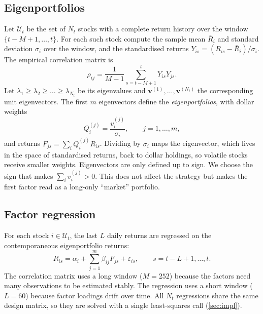 \subsection{Eigenportfolios}
\label{sec:method:pca}

Let $\mathcal U_t$ be the set of $N_t$ stocks with a complete return history over the window
$\{t-M+1,\dots,t\}$. For each such stock compute the sample mean $\bar R_i$ and standard
deviation $\sigma_i$ over the window, and the standardised returns
$Y_{is} = (R_{is} - \bar R_i)/\sigma_i$. The empirical correlation matrix is
\begin{equation}
  \rho_{ij} = \frac{1}{M-1} \sum_{s=t-M+1}^{t} Y_{is} Y_{js} .
\end{equation}
Let $\lambda_1 \ge \lambda_2 \ge \dots \ge \lambda_{N_t}$ be its eigenvalues and
$\bm v^{(1)},\dots,\bm v^{(N_t)}$ the corresponding unit eigenvectors. The first $m$
eigenvectors define the \emph{eigenportfolios}, with dollar weights
\begin{equation}
  Q_i^{(j)} = \frac{v_i^{(j)}}{\sigma_i}, \qquad j = 1,\dots,m,
  \label{eq:eigenportfolio}
\end{equation}
and returns $F_{js} = \sum_i Q_i^{(j)} R_{is}$. Dividing by $\sigma_i$ maps the eigenvector,
which lives in the space of standardised returns, back to dollar holdings, so volatile stocks
receive smaller weights. Eigenvectors are only defined up to sign. We choose the sign that
makes $\sum_i v_i^{(j)} > 0$. This does not affect the strategy but makes the first factor read
as a long-only ``market'' portfolio.

\subsection{Factor regression}
\label{sec:method:regression}

For each stock $i \in \mathcal U_t$, the last $L$ daily returns are regressed on the
contemporaneous eigenportfolio returns:
\begin{equation}
  R_{is} = \alpha_i + \sum_{j=1}^{m} \beta_{ij} F_{js} + \varepsilon_{is},
  \qquad s = t-L+1,\dots,t .
  \label{eq:regression}
\end{equation}
The correlation matrix uses a long window ($M=252$) because the factors need many observations
to be estimated stably. The regression uses a short window ($L=60$) because factor loadings
drift over time. All $N_t$ regressions share the same design matrix, so they are solved with a
single least-squares call (\cref{sec:impl}).

